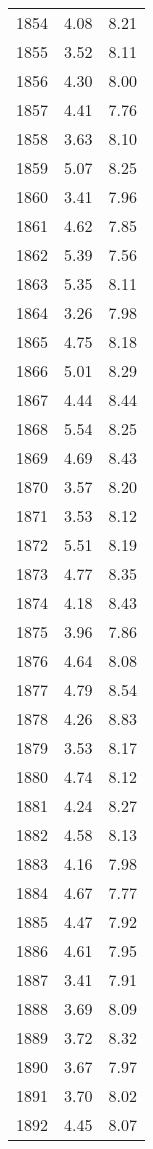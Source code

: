\begin{longtable}{lrr}
1854 &    4.08 &    8.21 \\
1855 &    3.52 &    8.11 \\
1856 &    4.30 &    8.00 \\
1857 &    4.41 &    7.76 \\
1858 &    3.63 &    8.10 \\
1859 &    5.07 &    8.25 \\
1860 &    3.41 &    7.96 \\
1861 &    4.62 &    7.85 \\
1862 &    5.39 &    7.56 \\
1863 &    5.35 &    8.11 \\
1864 &    3.26 &    7.98 \\
1865 &    4.75 &    8.18 \\
1866 &    5.01 &    8.29 \\
1867 &    4.44 &    8.44 \\
1868 &    5.54 &    8.25 \\
1869 &    4.69 &    8.43 \\
1870 &    3.57 &    8.20 \\
1871 &    3.53 &    8.12 \\
1872 &    5.51 &    8.19 \\
1873 &    4.77 &    8.35 \\
1874 &    4.18 &    8.43 \\
1875 &    3.96 &    7.86 \\
1876 &    4.64 &    8.08 \\
1877 &    4.79 &    8.54 \\
1878 &    4.26 &    8.83 \\
1879 &    3.53 &    8.17 \\
1880 &    4.74 &    8.12 \\
1881 &    4.24 &    8.27 \\
1882 &    4.58 &    8.13 \\
1883 &    4.16 &    7.98 \\
1884 &    4.67 &    7.77 \\
1885 &    4.47 &    7.92 \\
1886 &    4.61 &    7.95 \\
1887 &    3.41 &    7.91 \\
1888 &    3.69 &    8.09 \\
1889 &    3.72 &    8.32 \\
1890 &    3.67 &    7.97 \\
1891 &    3.70 &    8.02 \\
1892 &    4.45 &    8.07 \\

\end{longtable}
